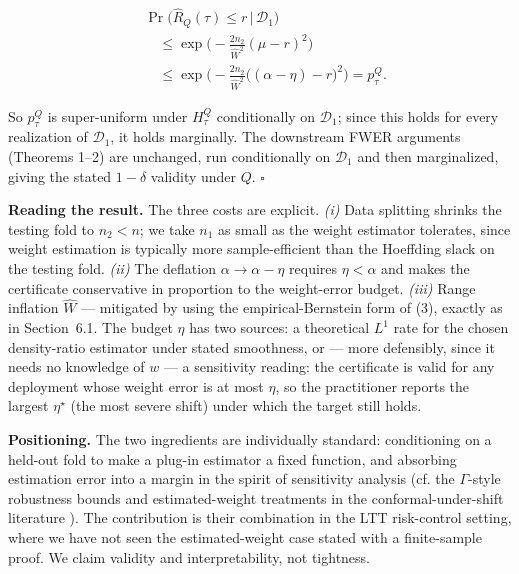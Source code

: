 \documentclass{ieeeaccess}
\begin{document}
\[
\begin{aligned}
&\Pr\big(\hat R_Q(\tau)\le r\,\big|\,\mathcal D_1\big)\\
&\quad\le
\exp\!\Big(-\tfrac{2n_2}{\hat W^2}(\mu-r)^2\Big)\\
&\quad\le
\exp\!\Big(-\tfrac{2n_2}{\hat W^2}
  \big((\alpha-\eta)-r\big)^2\Big)
=p^Q_\tau.
\end{aligned}
\]

So $p^Q_\tau$ is super-uniform under $H^Q_\tau$ conditionally on $\mathcal D_1$; since this holds for every realization of $\mathcal D_1$, it holds marginally. The downstream FWER arguments (Theorems 1--2) are unchanged, run conditionally on $\mathcal D_1$ and then marginalized, giving the stated $1-\delta$ validity under $Q$. $\square$

\textbf{Reading the result.} The three costs are explicit. \emph{(i)} Data splitting shrinks the testing fold to $n_2<n$; we take $n_1$ as small as the weight estimator tolerates, since weight estimation is typically more sample-efficient than the Hoeffding slack on the testing fold. \emph{(ii)} The deflation $\alpha\to\alpha-\eta$ requires $\eta<\alpha$ and makes the certificate conservative in proportion to the weight-error budget. \emph{(iii)} Range inflation $\hat W$ --- mitigated by using the empirical-Bernstein form of (3), exactly as in Section~6.1. The budget $\eta$ has two sources: a theoretical $L^1$ rate for the chosen density-ratio estimator under stated smoothness, or --- more defensibly, since it needs no knowledge of $w$ --- a sensitivity reading: the certificate is valid for any deployment whose weight error is at most $\eta$, so the practitioner reports the largest $\eta^\star$ (the most severe shift) under which the target still holds.

\textbf{Positioning.} The two ingredients are individually standard: conditioning on a held-out fold to make a plug-in estimator a fixed function, and absorbing estimation error into a margin in the spirit of sensitivity analysis (cf. the $\Gamma$-style robustness bounds and estimated-weight treatments in the conformal-under-shift literature \cite{tibshirani2020conformal,jin2023sensitivity}). The contribution is their combination in the LTT risk-control setting, where we have not seen the estimated-weight case stated with a finite-sample proof. We claim validity and interpretability, not tightness.
\end{document}
